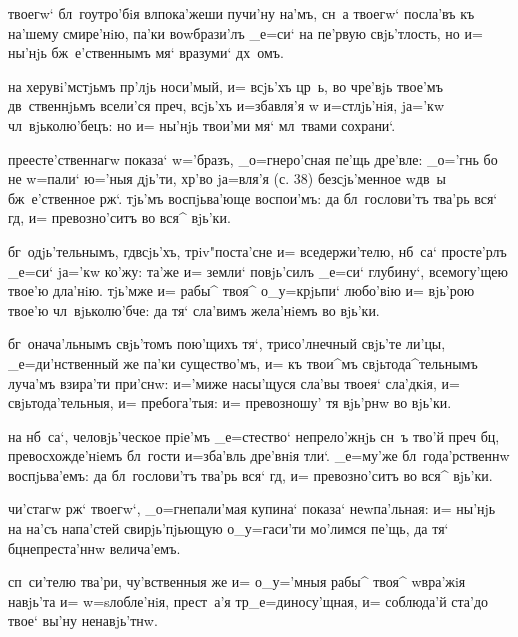   твоегw` бл~гоутро'бiя вл пока'жеши 
пучи'ну на'мъ, сн~а твоегw` посла'въ къ на'шему 
смире'нiю, па'ки воwбрази'лъ _е=си` на пе'рвую 
свjь'тлость, но и= ны'нjь бж~е'ственнымъ мя` вразуми` 
дх~омъ.

  на херувi'мстjьмъ пр'лjь 
носи'мый, и= всjь'хъ цр~ь, во чре'вjь твое'мъ 
дв~ственнjьмъ всели'ся преч, всjь'хъ и=збавля'я w\т 
и=стлjь'нiя, jа='кw чл~вjьколю'бецъ: но и= ны'нjь твои'ми 
мя` мл~твами сохрани`.


  преесте'ственнагw показа` w='бразъ, 
_о=гнеро'сная пе'щь дре'вле: _о='гнь бо не w=пали` ю='ныя 
дjь'ти, хр'во jа=вля'я (с. 38) безсjь'менное w\т дв~ы 
бж~е'ственное рж`. тjь'мъ воспjьва'юще воспои'мъ: да 
бл~гослови'тъ тва'рь вся` гд, и= превозно'ситъ во вся^ 
вjь'ки.

 бг~одjь'тельнымъ, гд всjь'хъ, 
трiv"поста'сне и= вседержи'телю, нб~са` просте'рлъ _е=си` 
jа='кw ко'жу: та'же и= земли` повjь'силъ _е=си` глубину`, 
всемогу'щею твое'ю дла'нiю. тjь'мже и= рабы^ твоя^ 
о_у=крjьпи` любо'вiю и= вjь'рою твое'ю чл~вjьколю'бче: да 
тя` сла'вимъ жела'нiемъ во вjь'ки.

  бг~онача'льнымъ свjь'томъ пою'щихъ 
тя`, трисо'лнечный свjь'те ли'цы, _е=ди'нственный же 
па'ки существо'мъ, и= къ твои^мъ свjьтода^тельнымъ 
луча'мъ взира'ти при'снw: и='миже насы'щуся сла'вы твоея` 
сла'дкiя, и= свjьтода'тельныя, и= пребога'тыя: и= 
превозношу' тя вjь'рнw во вjь'ки.

  на нб~са`, человjь'ческое 
прiе'мъ _е=стество` непрело'жнjь сн~ъ тво'й преч 
бц, превосхожде'нiемъ бл~гости и=зба'вль дре'внiя 
тли`. _е=му'же бл~года'рственнw воспjьва'емъ: да 
бл~гослови'тъ тва'рь вся` гд, и= превозно'ситъ во вся^ 
вjь'ки.


  чи'стагw рж` твоегw`, 
_о=гнепали'мая купина` показа` неwпа'льная: и= ны'нjь на 
на'съ напа'стей свирjь'пjьющую о_у=гаси'ти мо'лимся 
пе'щь, да тя` бц непреста'ннw велича'емъ.

 сп~си'телю тва'ри, чу'вственныя же и= 
о_у='мныя рабы^ твоя^ w\т вра'жiя навjь'та и= 
w=sлобле'нiя, прест~а'я тр _е=диносу'щная, и= 
соблюда'й ста'до твое` вы'ну ненавjь'тнw. 

